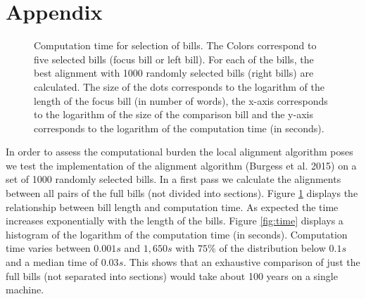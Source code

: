 \documentclass[12pt]{article} %
\begin{document}
\clearpage





\section*{Appendix}

\begin{figure}[ht!]
\caption{Computation time for selection of bills. The Colors correspond to five selected bills (focus bill or left bill). For each of the bills, the best alignment with 1000 randomly selected bills (right bills) are calculated. The size of the dots corresponds to the logarithm of the length of the focus bill (in number of words), the x-axis corresponds to the logarithm of the size of the comparison bill and the y-axis corresponds to the logarithm of the computation time (in seconds).}
\label{fig:time_size}
\end{figure}

In order to assess the computational burden the local alignment algorithm poses we test the implementation of the alignment algorithm (Burgess et al. 2015) on a set of 1000 randomly selected bills. In a first pass we calculate the alignments  between all pairs of the full bills (not divided into sections). Figure \ref{fig:time_size} displays the relationship between bill length and computation time. As expected the time increases exponentially with the length of the bills. Figure \ref{fig:time} displays a histogram of the logarithm of the computation time (in seconds). Computation time varies between $0.001s$ and $1,650s$ with $75\%$ of the distribution below $0.1s$ and a median time of $0.03s$.  This shows that an exhaustive comparison of just the full bills (not separated into sections) would take about 100 years on a single machine.
\end{document}
